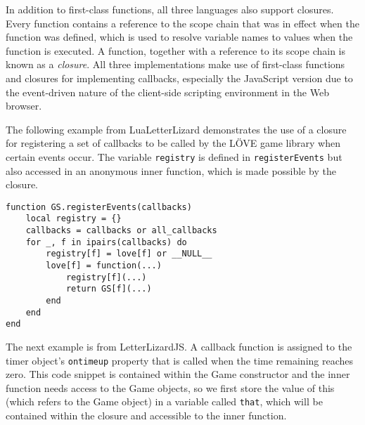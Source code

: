 
In addition to first-class functions, all three languages also support closures.
Every function contains a reference to the scope chain that was
in effect when the function was defined, which is used to resolve variable
names to values when the function is executed. A function, together with a
reference to its scope chain is known as a \emph{closure}.
All three implementations make use of first-class functions and closures for 
implementing callbacks, especially the JavaScript version due to the 
event-driven nature of the client-side scripting environment in the Web browser.

The following example from LuaLetterLizard demonstrates the use of a closure
for registering a set of callbacks to be called by the L\"OVE game library when
certain events occur. The variable \texttt{registry} is defined in \texttt{registerEvents}
but also accessed in an anonymous inner function, which is made possible by the closure.

\begin{lstlisting}[language={[5.2]Lua},caption=A closure in Lua]
function GS.registerEvents(callbacks)
	local registry = {}
	callbacks = callbacks or all_callbacks
	for _, f in ipairs(callbacks) do
		registry[f] = love[f] or __NULL__
		love[f] = function(...)
			registry[f](...)
			return GS[f](...)
		end
	end
end
\end{lstlisting}

The next example is from LetterLizardJS. A callback function is assigned to the
timer object's \texttt{ontimeup} property that is called when the time remaining
reaches zero. This code snippet is contained within the Game constructor and the
inner function needs access to the Game objects, so we first store the value of this
(which refers to the Game object) in a variable called \texttt{that}, which will be
contained within the closure and accessible to the inner function.

